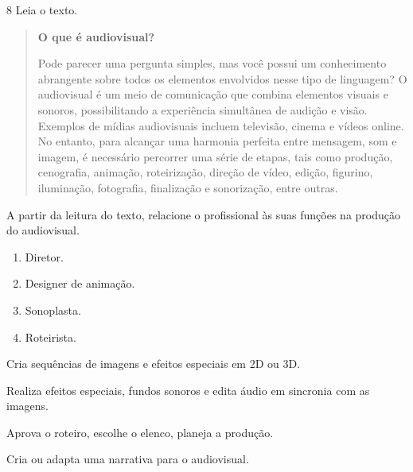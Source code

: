 
\pagebreak
\num{8} Leia o texto.

\begin{quote}
\textbf{O que é audiovisual?}

Pode parecer uma pergunta simples, mas você possui um conhecimento 
abrangente sobre todos os elementos envolvidos nesse tipo de linguagem? 
O audiovisual é um meio de comunicação que combina elementos visuais e 
sonoros, possibilitando a experiência simultânea de audição e visão. 
Exemplos de mídias audiovisuais incluem televisão, cinema e vídeos online. 
No entanto, para alcançar uma harmonia perfeita entre mensagem, som e 
imagem, é necessário percorrer uma série de etapas, tais como produção, 
cenografia, animação, roteirização, direção de vídeo, edição, figurino, 
iluminação, fotografia, finalização e sonorização, entre outras.

\end{quote}

A partir da leitura do texto, relacione o profissional às suas funções
na produção do audiovisual.

\begin{enumerate}
\item Diretor.

\item Designer de animação.

\item  Sonoplasta.

\item Roteirista.
\end{enumerate}

\begin{boxlist}
 Cria sequências de imagens e efeitos especiais em 2D ou 3D.

 Realiza efeitos especiais, fundos sonoros e edita áudio em sincronia com as imagens.

 Aprova o roteiro, escolhe o elenco, planeja a produção.

 Cria ou adapta uma narrativa para o audiovisual.
\end{boxlist}

